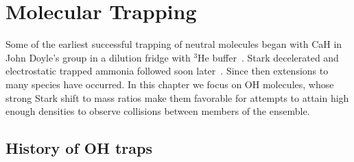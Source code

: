 %
%
%

\chapter{Molecular Trapping}

Some of the earliest successful trapping of neutral molecules began with CaH in John Doyle's group in a dilution fridge with $^3$He buffer~\cite{Weinstein1998}.
Stark decelerated and electrostatic trapped ammonia followed soon later~\cite{Bethlem2000trap}.
Since then extensions to many species have occurred. 
In this chapter we focus on OH molecules, whose strong Stark shift to mass ratios make them favorable for attempts to attain high enough densities to observe collisions between members of the ensemble.

\section{History of OH traps}

